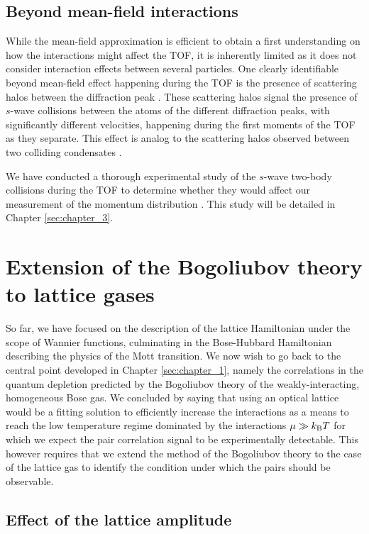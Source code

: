 \subsection{Beyond mean-field interactions}

While the mean-field approximation is efficient to obtain a first understanding on how the interactions might affect the TOF, it is inherently limited as it does not consider interaction effects between several particles. One clearly identifiable beyond mean-field effect happening during the TOF is the presence of scattering halos between the diffraction peak \cite{greiner2001exploring}. These scattering halos signal the presence of $s$-wave collisions between the atoms of the different diffraction peaks, \ie with significantly different velocities, happening during the first moments of the TOF as they separate. This effect is analog to the scattering halos observed between two colliding condensates \cite{khakimov2016ghost,perrin2007observation,zin2006elastic}.

We have conducted a thorough experimental study of the $s$-wave two-body collisions during the TOF to determine whether they would affect our measurement of the momentum distribution \cite{tenart2020two}. This study will be detailed in Chapter \ref{sec:chapter_3}.

\section{Extension of the Bogoliubov theory to lattice gases}

So far, we have focused on the description of the lattice Hamiltonian under the scope of Wannier functions, culminating in the Bose-Hubbard Hamiltonian describing the physics of the Mott transition. We now wish to go back to the central point developed in Chapter \ref{sec:chapter_1}, namely the \kmk correlations in the quantum depletion predicted by the Bogoliubov theory of the weakly-interacting, homogeneous Bose gas. We concluded by saying that using an optical lattice would be a fitting solution to efficiently increase the interactions as a means to reach the low temperature regime dominated by the interactions $\mu \gg k_{\mathrm{B}} T$ for which we expect the pair correlation signal to be experimentally detectable. This however requires that we extend the method of the Bogoliubov theory to the case of the lattice gas to identify the condition under which the \kmk pairs should be observable.

\subsection{Effect of the lattice amplitude}

